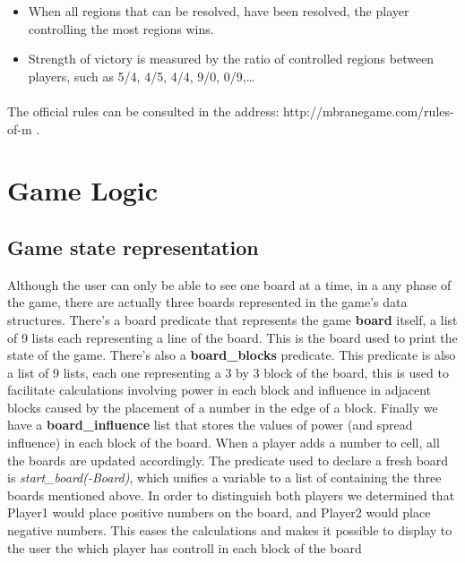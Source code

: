 \documentclass[a4paper]{article}
\begin{document}
\begin{itemize}
    \item When all regions that can be resolved, have been resolved, the player controlling the most regions wins.
    \item Strength of victory is measured by the ratio of controlled regions between players, such as 5/4, 4/5, 4/4, 9/0, 0/9,\ldots
\end{itemize}

\paragraph{}
The official rules can be consulted in the address: http://mbranegame.com/rules-of-m \cite{Rules}.

\pagebreak
\section{Game Logic}


\subsection{Game state representation} 
Although the user can only be able to see one board at a time, in a any phase of the game, there are actually three
boards represented in the game’s data structures. There’s a board predicate that represents the game \textbf{board} itself, a
list of 9 lists each representing a line of the board. This is the board used to print the state of the game. There’s 
also a \textbf{board\_blocks} predicate. This predicate is also a list of 9 lists, each one representing a 3 by 3 block of the 
board, this is used to facilitate calculations involving power in each block and influence in adjacent blocks caused 
by the placement of a number in the edge of a block. Finally we have a \textbf{board\_influence} list that stores the values of 
power (and spread influence) in each block of the board.  When a player adds a number to cell, all the boards are 
updated accordingly. The predicate used to declare a fresh board is \textit{start\_board(-Board)}, which unifies a variable to a list 
of containing the three boards mentioned above. In order to distinguish both players we determined that Player1 would place 
positive numbers on the board, and Player2 would place negative numbers. This eases the calculations and makes it possible 
to display to the user the which player has controll in each block of the board
\end{document}
